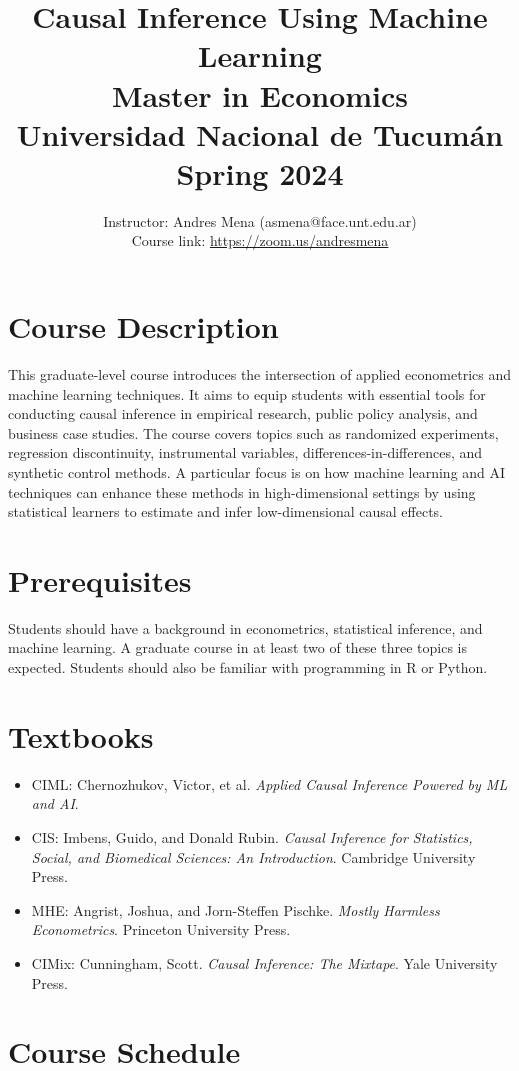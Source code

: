 \documentclass[12pt]{article}
\title{Causal Inference Using Machine Learning\\
Master in Economics\\
Universidad Nacional de Tucumán\\
Spring 2024}
\author{Instructor: Andres Mena (asmena@face.unt.edu.ar)\\
Course link: \url{https://zoom.us/andresmena}}
\date{}
\begin{document}
\maketitle

\section*{Course Description}
This graduate-level course introduces the intersection of applied econometrics and machine learning techniques. It aims to equip students with essential tools for conducting causal inference in empirical research, public policy analysis, and business case studies. The course covers topics such as randomized experiments, regression discontinuity, instrumental variables, differences-in-differences, and synthetic control methods. A particular focus is on how machine learning and AI techniques can enhance these methods in high-dimensional settings by using statistical learners to estimate and infer low-dimensional causal effects.

\section*{Prerequisites}
Students should have a background in econometrics, statistical inference, and machine learning. A graduate course in at least two of these three topics is expected. Students should also be familiar with programming in R or Python.

\section*{Textbooks}
\begin{itemize}
    \item CIML: Chernozhukov, Victor, et al. \emph{Applied Causal Inference Powered by ML and AI}.
    \item CIS: Imbens, Guido, and Donald Rubin. \emph{Causal Inference for Statistics, Social, and Biomedical Sciences: An Introduction}. Cambridge University Press.
    \item MHE: Angrist, Joshua, and Jorn-Steffen Pischke. \emph{Mostly Harmless Econometrics}. Princeton University Press.
    \item CIMix: Cunningham, Scott. \emph{Causal Inference: The Mixtape}. Yale University Press.
\end{itemize}

\section*{Course Schedule}
\end{document}
